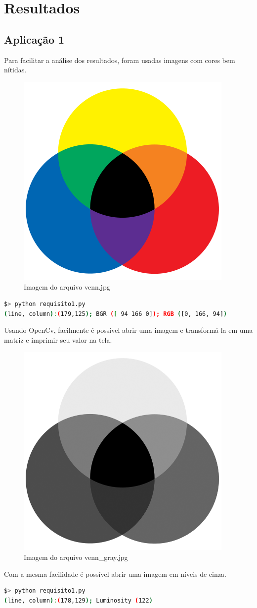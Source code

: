 \documentclass[conference]{IEEEtran}
\begin{document}
\section{Resultados}
\subsection*{Aplicação 1}
Para facilitar a análise dos resultados, foram usadas imagens com cores bem nítidas.
\begin{figure}[h!]
\begin{center}
\includegraphics[width=0.28\columnwidth]{venn.png}
\caption{Imagem do arquivo venn.jpg}
\end{center}
\end{figure}
\begin{lstlisting}[language=bash]
$> python requisito1.py
(line, column):(179,125); BGR ([ 94 166 0]); RGB ([0, 166, 94])
\end{lstlisting}

Usando OpenCv, facilmente é possível abrir uma imagem e transformá-la em uma matriz e imprimir seu valor na tela.

\begin{figure}[h!]
\begin{center}
\includegraphics[width=0.28\columnwidth]{venn_gray.png}
\caption{Imagem do arquivo venn\_gray.jpg}
\end{center}
\end{figure}

Com a mesma facilidade é possível abrir uma imagem em níveis de cinza.

\begin{lstlisting}[language=bash]
$> python requisito1.py
(line, column):(178,129); Luminosity (122)
\end{lstlisting}
\end{document}
